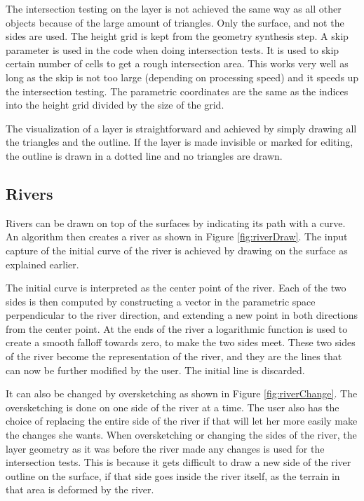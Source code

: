 \documentclass[a4paper,12pt]{report}
\begin{document}
The intersection testing on the layer is not achieved the same way as all other objects because of the large amount of triangles. Only the surface, and not the sides are used. The height grid is kept from the geometry synthesis step. A skip parameter is used in the code when doing intersection tests. It is used to skip certain number of cells to get a rough intersection area. This works very well as long as the skip is not too large (depending on processing speed) and it speeds up the intersection testing. The parametric coordinates are the same as the indices into the height grid divided by the size of the grid.

The visualization of a layer is straightforward and achieved by simply drawing all the triangles and the outline. If the layer is made invisible or marked for editing, the outline is drawn in a dotted line and no triangles are drawn.

\subsection{Rivers}
Rivers can be drawn on top of the surfaces by indicating its path with a curve. An algorithm then creates a river as shown in Figure \ref{fig:riverDraw}. 
The input capture of the initial curve of the river is achieved by drawing on the surface as explained earlier.

The initial curve is interpreted as the center point of the river. Each of the two sides is then computed by constructing a vector in the parametric space perpendicular to the river direction, and extending a new point in both directions from the center point. At the ends of the river a logarithmic function is used to create a smooth falloff towards zero, to make the two sides meet. These two sides of the river become the representation of the river, and they are the lines that can now be further modified by the user. The initial line is discarded.



It can also be changed by oversketching as shown in Figure \ref{fig:riverChange}. The oversketching is done on one side of the river at a time. The user also has the choice of replacing the entire side of the river if that will let her more easily make the changes she wants.
When oversketching or changing the sides of the river, the layer geometry as it was before the river made any changes is used for the intersection tests. This is because it gets difficult to draw a new side of the river outline on the surface, if that side goes inside the river itself, as the terrain in that area is deformed by the river.
\end{document}
